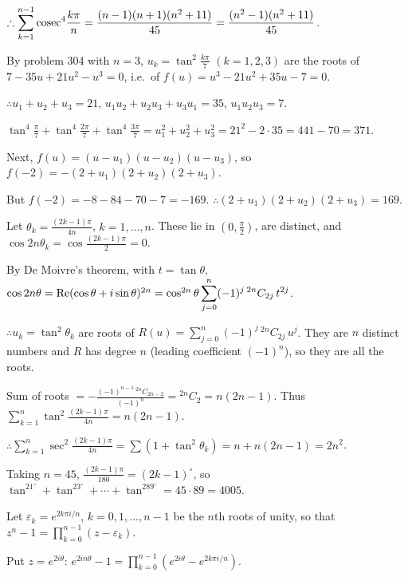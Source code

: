   $\therefore \displaystyle\sum_{k = 1}^{n - 1}{\rm cosec}^4\frac{k\pi}{n} = \frac{(n - 1)(n + 1)(n^2 +
    11)}{45} = \frac{(n^2 - 1)(n^2 + 11)}{45}$.
\item By problem 304 with $n = 3$, $u_k = \tan^2\frac{k\pi}{7}$ $(k = 1, 2, 3)$ are the roots of $7 - 35u +
  21u^2 - u^3 = 0$, i.e.\ of $f(u) = u^3 - 21u^2 + 35u - 7 = 0$.

  $\therefore u_1 + u_2 + u_3 = 21$, $u_1u_2 + u_2u_3 + u_3u_1 = 35$, $u_1u_2u_3 = 7$.

  $\tan^4\frac{\pi}{7} + \tan^4\frac{2\pi}{7} + \tan^4\frac{3\pi}{7} = u_1^2 + u_2^2 + u_3^2 = 21^2 - 2\cdot 35 =
  441 - 70 = 371$.

  Next, $f(u) = (u - u_1)(u - u_2)(u - u_3)$, so $f(-2) = -(2 + u_1)(2 + u_2)(2 + u_3)$.

  But $f(-2) = -8 - 84 - 70 - 7 = -169$. $\therefore (2 + u_1)(2 + u_2)(2 + u_3) = 169$.
\item Let $\theta_k = \frac{(2k - 1)\pi}{4n}$, $k = 1, \ldots, n$. These lie in $\left(0, \frac{\pi}{2}\right)$,
  are distinct, and $\cos2n\theta_k = \cos\frac{(2k - 1)\pi}{2} = 0$.

  By De Moivre's theorem, with $t = \tan\theta$, $\cos2n\theta = {\rm Re}(\cos\theta + i\sin\theta)^{2n}
  = \cos^{2n}\theta\displaystyle\sum_{j = 0}^{n}(-1)^j\,{}^{2n}C_{2j}\,t^{2j}$.

  $\therefore u_k = \tan^2\theta_k$ are roots of $R(u) = \displaystyle\sum_{j = 0}^{n}(-1)^j\,{}^{2n}C_{2j}\,u^j$.
  They are $n$ distinct numbers and $R$ has degree $n$ (leading coefficient $(-1)^n$), so they are all the roots.

  Sum of roots $= -\frac{(-1)^{n - 1}\,{}^{2n}C_{2n - 2}}{(-1)^n} = {}^{2n}C_2 = n(2n - 1)$. Thus
  $\displaystyle\sum_{k = 1}^{n}\tan^2\frac{(2k - 1)\pi}{4n} = n(2n - 1)$.

  $\therefore \displaystyle\sum_{k = 1}^{n}\sec^2\frac{(2k - 1)\pi}{4n} = \sum(1 + \tan^2\theta_k) = n + n(2n -
  1) = 2n^2$.

  Taking $n = 45$, $\frac{(2k - 1)\pi}{180} = (2k - 1)^\circ$, so $\tan^21^\circ + \tan^23^\circ + \cdots
  + \tan^289^\circ = 45\cdot 89 = 4005$.
\item Let $\varepsilon_k = e^{2k\pi i/n}$, $k = 0, 1, \ldots, n - 1$ be the $n$th roots of unity, so that $z^n
  - 1 = \displaystyle\prod_{k = 0}^{n - 1}(z - \varepsilon_k)$.

  Put $z = e^{2i\theta}$: $e^{2in\theta} - 1 = \displaystyle\prod_{k = 0}^{n - 1}\left(e^{2i\theta} - e^{2k\pi
    i/n}\right)$.

